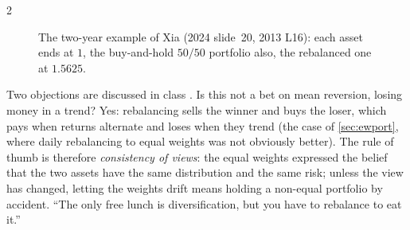 \begin{paracol}{2}
\begin{figure}[ht]
\centering
{}
\caption{The two-year example of Xia (2024 slide~20, 2013 L16): each asset ends at $1$, the buy-and-hold $50/50$
portfolio also, the rebalanced one at $1.5625$.}\label{ch10:fig-rebal}
\end{figure}

Two objections are discussed in class . Is this not a bet on mean reversion,
losing money in a trend? Yes: rebalancing sells the winner and buys the loser, which pays when returns alternate
and loses when they trend (the case of \cref{sec:ewport}, where daily rebalancing to equal weights was not obviously
better). The rule of thumb is therefore \emph{consistency of views}: the equal weights expressed the belief that the
two assets have the same distribution and the same risk; unless the view has changed, letting the weights drift
means holding a non-equal portfolio by accident. ``The only free lunch is diversification, but you have to
rebalance to eat it.''


\end{paracol}
